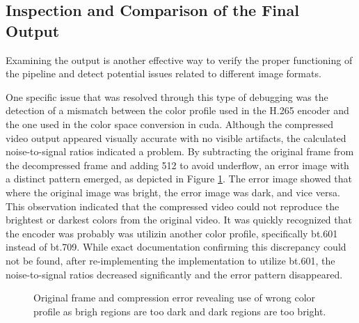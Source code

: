 \subsection{Inspection and Comparison of the Final Output}
Examining the output is another effective way to verify the proper functioning of the pipeline and detect potential issues related to different image formats.

One specific issue that was resolved through this type of debugging was the detection of a mismatch between the color profile used in the H.265 encoder and the one used in the color space conversion in \gls{cuda}.
Although the compressed video output appeared visually accurate with no visible artifacts, the calculated noise-to-signal ratios indicated a problem.
By subtracting the original frame from the decompressed frame and adding 512 to avoid underflow, an error image with a distinct pattern emerged, as depicted in Figure \ref{fig:compression_error}.
The error image showed that where the original image was bright, the error image was dark, and vice versa.
This observation indicated that the compressed video could not reproduce the brightest or darkest colors from the original video.
It was quickly recognized that the encoder was probably was utilizin another color profile, specifically bt.601 instead of bt.709.
While exact documentation confirming this discrepancy could not be found, after re-implementing the \cuda implementation to utilize bt.601, the noise-to-signal ratios decreased significantly and the error pattern disappeared.

\begin{figure}[H]
    \centering
    \caption{Original frame and compression error revealing use of wrong color profile as brigh regions are too dark and dark regions are too bright.}
    \label{fig:compression_error}
\end{figure}